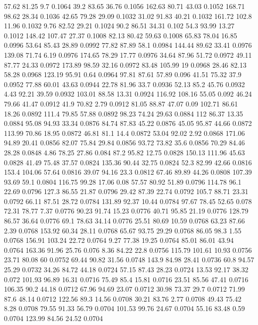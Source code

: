 57.62	81.25	9.7	0.1064
39.2	83.65	36.76	0.1056
162.63	80.71	43.03	0.1052
168.71	98.62	28.34	0.1036
42.65	79.28	29.09	0.1032
31.02	91.83	40.21	0.1032
161.72	102.8	11.96	0.1032
9.76	82.52	29.21	0.1024
90.2	86.51	34.31	0.102
54.3	93.99	13.27	0.1012
148.42	107.47	27.37	0.1008
82.13	80.42	59.63	0.1008
65.83	78.04	16.85	0.0996
53.64	85.43	28.89	0.0992
77.82	87.89	58.1	0.0984
144.44	89.62	33.41	0.0976
139.08	71.74	6.19	0.0976
174.65	78.29	17.77	0.0976
34.64	87.96	51.72	0.0972
49.11	87.77	24.33	0.0972
173.89	98.59	32.16	0.0972
83.48	105.99	19	0.0968
28.46	82.13	58.28	0.0968
123.19	95.91	0.64	0.0964
97.81	87.61	57.89	0.096
41.51	75.32	37.9	0.0952
77.88	60.01	43.63	0.0944
22.78	81.96	33.7	0.0936
52.13	85.2	45.76	0.0932
4.43	92.21	39.59	0.0932
103.01	88.58	13.31	0.0924
116.92	108.16	55.05	0.092
46.24	79.66	41.47	0.0912
41.9	70.82	2.79	0.0912
81.05	88.87	47.07	0.09
102.71	86.61	18.26	0.0892
111.4	79.85	57.88	0.0892
98.23	74.24	29.63	0.0884
112	86.37	13.35	0.0884
95.08	94.93	33.34	0.0876
84.74	87.83	45.22	0.0876
45.05	95.87	44.66	0.0872
113.99	70.86	18.95	0.0872
46.81	81.1	14.4	0.0872
53.04	92.02	2.92	0.0868
171.06	94.89	20.41	0.0856
82.07	75.84	29.84	0.0856
93.72	73.82	35.6	0.0856
70.29	84.46	28.28	0.0848
4.86	78.25	27.86	0.084
87.2	95.82	12.75	0.0828
150.13	111.96	45.63	0.0828
41.49	75.48	37.57	0.0824
135.36	90.44	32.75	0.0824
52.3	82.99	42.66	0.0816
153.4	104.06	57.64	0.0816
39.07	94.16	23.3	0.0812
67.46	89.89	44.26	0.0808
107.39	93.69	59.1	0.0804
116.75	99.28	17.06	0.08
57.57	80.92	51.89	0.0796
114.78	96.1	22.69	0.0796
127.3	86.55	21.87	0.0796
29.42	87.39	22.74	0.0792
105.7	88.71	23.31	0.0792
66.11	87.51	28.72	0.0784
131.89	92.37	10.44	0.0784
97.67	78.45	52.65	0.078
72.31	78.77	7.37	0.0776
90.23	91.74	15.23	0.0776
40.71	95.85	21.19	0.0776
128.79	86.57	36.64	0.0776
69.1	78.63	34.14	0.0776
25.51	80.69	10.59	0.0768
63.23	87.66	2.39	0.0768
153.92	60.34	28.11	0.0768
65.67	93.75	29.29	0.0768
86.05	98.3	1.55	0.0768
156.91	103.24	22.72	0.0764
9.27	77.38	19.25	0.0764
85.01	86.01	43.94	0.0764
163.36	91.96	25.76	0.076
8.36	84.22	22.8	0.0756
115.79	101.61	10.93	0.0756
23.71	80.08	60	0.0752
69.44	90.82	31.56	0.0748
143.9	84.98	28.41	0.0736
60.8	94.57	25.29	0.0732
34.26	84.72	44.18	0.0724
57.15	87.43	28.23	0.0724
13.53	92.17	38.32	0.072
101.93	96.89	16.31	0.0716
75.49	85.4	15.81	0.0716
23.51	85.56	47.41	0.0716
106.35	90.2	44.18	0.0712
67.96	94.69	23.07	0.0712
30.98	73.37	29.7	0.0712
71.99	87.6	48.14	0.0712
122.56	89.3	14.56	0.0708
30.21	83.76	2.77	0.0708
49.43	75.42	8.28	0.0708
79.55	91.33	56.79	0.0704
101.53	99.76	24.67	0.0704
55.16	83.48	0.59	0.0704
123.99	84.56	24.52	0.0704
